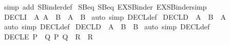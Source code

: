 \begin{isabellebody}
%
\isadelimproof
%
\endisadelimproof
%
\isatagproof
{}\isamarkupfalse%
\ {\isacharparenleft}simp\ add{\isacharcolon}\ SBinder{\isacharunderscore}def{\isacharparenright}%
\endisatagproof
{\isafoldproof}%
%
\isadelimproof
\isanewline
%
\endisadelimproof
\isanewline
{}\isamarkupfalse%
\ SB{}{\isacharunderscore}eq\ SB{\isacharunderscore}eq\ EX{\isacharunderscore}SBinder{}\ EX{\isacharunderscore}SBinder{\isacharbrackleft}simp{\isacharbrackright}%
\isamarkuptrue%
\isamarkupfalse%
\ DECL{\isacharunderscore}I\ {\isacharcolon}\ {\isachardoublequoteopen}{\isasymlbrakk}A{\isacharsemicolon}\ A\ {\isasymLongrightarrow}\ B{\isasymrbrakk}\ {\isasymLongrightarrow}\ A\ {\isacharbar}{\isacharminus}{\isacharminus}{\isacharminus}{\isacharminus}\ B{\isachardoublequoteclose}\isanewline
%
\isadelimproof
%
\endisadelimproof
%
\isatagproof
{}\isamarkupfalse%
\ {\isacharparenleft}auto\ simp{\isacharcolon}\ DECL{\isacharunderscore}def{\isacharparenright}%
\endisatagproof
{\isafoldproof}%
%
\isadelimproof
\isanewline
%
\endisadelimproof
\isanewline
{}\isamarkupfalse%
\ DECL{\isacharunderscore}D{}\ {\isacharcolon}\ {\isachardoublequoteopen}A\ {\isacharbar}{\isacharminus}{\isacharminus}{\isacharminus}{\isacharminus}\ B\ {\isasymLongrightarrow}\ A{\isachardoublequoteclose}\isanewline
%
\isadelimproof
%
\endisadelimproof
%
\isatagproof
{}\isamarkupfalse%
\ {\isacharparenleft}auto\ simp{\isacharcolon}\ DECL{\isacharunderscore}def{\isacharparenright}%
\endisatagproof
{\isafoldproof}%
%
\isadelimproof
\isanewline
%
\endisadelimproof
\isanewline
{}\isamarkupfalse%
\ DECL{\isacharunderscore}D{}\ {\isacharcolon}\ {\isachardoublequoteopen}A\ {\isacharbar}{\isacharminus}{\isacharminus}{\isacharminus}{\isacharminus}\ B\ {\isasymLongrightarrow}\ B{\isachardoublequoteclose}\isanewline
%
\isadelimproof
%
\endisadelimproof
%
\isatagproof
{}\isamarkupfalse%
\ {\isacharparenleft}auto\ simp{\isacharcolon}\ DECL{\isacharunderscore}def{\isacharparenright}%
\endisatagproof
{\isafoldproof}%
%
\isadelimproof
\isanewline
%
\endisadelimproof
\isanewline
{}\isamarkupfalse%
\ DECL{\isacharunderscore}E{\isacharcolon}\ {\isachardoublequoteopen}{\isasymlbrakk}P\ {\isacharbar}{\isacharminus}{\isacharminus}{\isacharminus}{\isacharminus}\ Q{\isacharsemicolon}\ {\isasymlbrakk}P{\isacharsemicolon}\ Q{\isasymrbrakk}\ {\isasymLongrightarrow}\ R{\isasymrbrakk}\ {\isasymLongrightarrow}\ R{\isachardoublequoteclose}\isanewline

\end{isabellebody}
